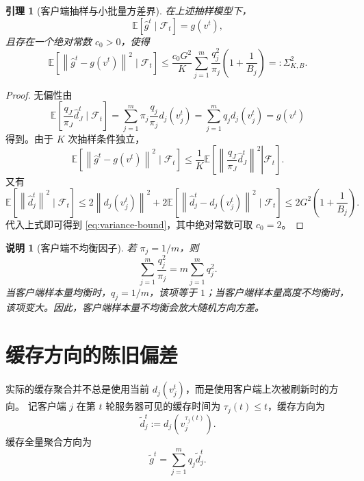 \documentclass[UTF8,a4paper,11pt]{ctexart}
\newtheorem{lemma}{引理}
\newtheorem{remark}{说明}
\newcommand{\E}{\mathbb{E}}
\newcommand{\F}{\mathcal{F}}
\newcommand{\norm}[1]{\left\|#1\right\|}
\begin{document}
\begin{lemma}[客户端抽样与小批量方差界]
\label{lem:variance}
在上述抽样模型下，
\begin{equation}
    \E[\widehat g^t\mid\F_t]
    =
    g(v^t),
    \label{eq:unbiased}
\end{equation}
且存在一个绝对常数 $c_0>0$，使得
\begin{equation}
    \E\left[
    \norm{\widehat g^t-g(v^t)}^2
    \mid\F_t
    \right]
    \le
    \frac{c_0G^2}{K}
    \sum_{j=1}^m
    \frac{q_j^2}{\pi_j}
    \left(
        1+\frac{1}{B_j}
    \right)
    =:\Sigma_{K,B}^2.
    \label{eq:variance-bound}
\end{equation}
\end{lemma}

\begin{proof}
无偏性由
\[
    \E\left[
    \frac{q_{J}}{\pi_J}\widehat d_J^t
    \mid\F_t
    \right]
    =
    \sum_{j=1}^m
    \pi_j
    \frac{q_j}{\pi_j}
    d_j(v_j^t)
    =
    \sum_{j=1}^m q_j d_j(v_j^t)
    =
    g(v^t)
\]
得到。由于 $K$ 次抽样条件独立，
\[
    \E\left[
    \norm{\widehat g^t-g(v^t)}^2
    \mid\F_t
    \right]
    \le
    \frac{1}{K}
    \E\left[
    \left.
    \left\|
    \frac{q_J}{\pi_J}\widehat d_J^t
    \right\|^2
    \right|\F_t
    \right].
\]
又有
\[
    \E[\norm{\widehat d_j^t}^2\mid\F_t]
    \le
    2\norm{d_j(v_j^t)}^2
    +
    2\E[\norm{\widehat d_j^t-d_j(v_j^t)}^2\mid\F_t]
    \le
    2G^2\left(1+\frac{1}{B_j}\right).
\]
代入上式即可得到 \eqref{eq:variance-bound}，其中绝对常数可取 $c_0=2$。
\end{proof}

\begin{remark}[客户端不均衡因子]
若 $\pi_j=1/m$，则
\[
    \sum_{j=1}^m\frac{q_j^2}{\pi_j}
    =
    m\sum_{j=1}^m q_j^2.
\]
当客户端样本量均衡时，$q_j=1/m$，该项等于 $1$；当客户端样本量高度不均衡时，该项变大。因此，客户端样本量不均衡会放大随机方向方差。
\end{remark}

\section{缓存方向的陈旧偏差}

实际的缓存聚合并不总是使用当前 $d_j(v_j^t)$，而是使用客户端上次被刷新时的方向。
记客户端 $j$ 在第 $t$ 轮服务器可见的缓存时间为 $\tau_j(t)\le t$，缓存方向为
\[
    \widetilde d_j^t
    :=
    d_j(v_j^{\tau_j(t)}).
\]
缓存全量聚合方向为
\[
    \widetilde g^t
    =
    \sum_{j=1}^m q_j \widetilde d_j^t.
\]
\end{document}
